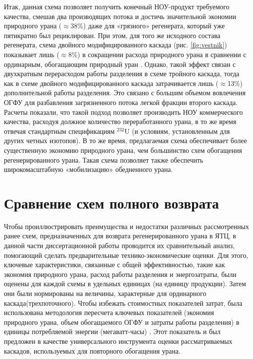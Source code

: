 Итак, данная схема позволяет получить конечный НОУ-продукт требуемого качества, смешав два производящих потока и достичь значительной экономии природного урана ($\approx$38\%) даже для «грязного» регенерата, который уже  пятикратно был рециклирован.
При этом, для того же исходного состава регенерата, схема двойного модифицированного каскада (рис. \ref{fig:vestnik}) показывает лишь ($\approx$8\%) в сокращении расхода природного урана в сравнении с ординарным, обогащающим природный уран \cite{smirnovObogashchenieRegenerirovannogoUrana2018}.
Однако, такой эффект связан с двухкратным перерасходом работы разделения в схеме тройного каскада, тогда как в схеме двойного модифицированного каскада затрачивается лишь ($\approx$13\%) дополнительной работы разделения.
Это связано с большим объемом вовлечения ОГФУ для разбавления загрязненного потока легкой фракции второго каскада.
Расчеты показали, что такой подход позволяет производить НОУ коммерческого качества, расходуя должное количество переработанного урана, в то же время отвечая стандартным спецификациям $^{232}$U (и условиям, установленным для других четных изотопов).
В то же время, предлагаемая схема обеспечивает более существенную экономию природного урана, чем большинство схем обогащения регенерированного урана.
Такая схема позволяет также обеспечить широкомасштабную «мобилизацию» обедненного урана.

\section{Сравнение схем полного возврата}

Чтобы проиллюстрировать преимущества и недостатки различных рассмотренных ранее схем, предназначенных для возврата регенерированного урана в ЯТЦ, в данной части диссертационной работы проводится их сравнительный анализ, помогающий сделать предварительные технико-экономические оценки.
Для этого, ключевые характеристики, связанные с общей эффективностью, такие как экономия природного урана, расход работы разделения и энергозатраты, были оценены для каждой схемы в удельных единицах (на единицу продукции).
Затем они были нормированы на величины, характерные для ординарного каскада(трехпоточного).
Чтобы избежать стоимостных показателей затрат, была использована методология пересчета ключевых показателей (экономия природного урана, объем обогащаемого ОГФУ и затраты работы разделения) в единицы потребляемой энергии (мегаватт-часы)  \cite{rodionovaAnalizTehnikoekonomicheskihHarakteristik2019}.
Этот показатель и был предложен в качестве универсального инструмента оценки рассматриваемых каскадов, используемых для повторного обогащения урана.


